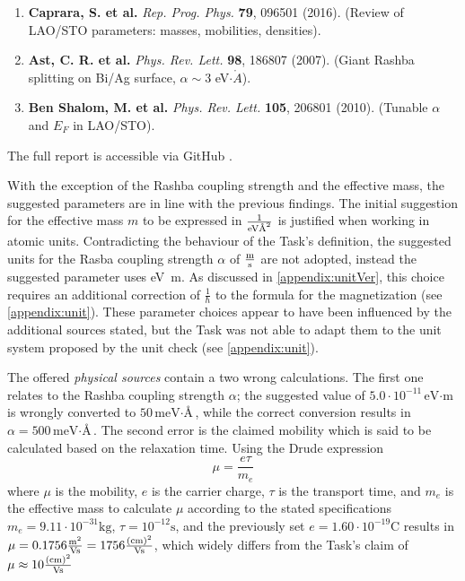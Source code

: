 \documentclass[
	fontsize = 11pt,
	paper = a4,
	draft = false,
	twoside = true,
	titlepage = false
]{scrartcl}
\numberwithin{equation}{subsection}
\begin{document}
\begin{tcolorbox} [enhanced, breakable, title=Parameter Suggestions for the Implementation as Stated in the Output, colback=blue!5!white, colframe=blue!75!black]
\begin{enumerate}
			\item \textbf{Caprara, S. et al.} \textit{Rep. Prog. Phys.} \textbf{79}, 096501 (2016). (Review of LAO/STO parameters: masses, mobilities, densities).\\
			\item \textbf{Ast, C. R. et al.} \textit{Phys. Rev. Lett.} \textbf{98}, 186807 (2007). (Giant Rashba splitting on Bi/Ag surface, $\alpha \sim 3$ eV$\cdot\mathring{A}$).\\
			\item \textbf{Ben Shalom, M. et al.} \textit{Phys. Rev. Lett.} \textbf{105}, 206801 (2010). (Tunable $\alpha$ and $E_F$ in LAO/STO).
		\end{enumerate}
	\end{tcolorbox}
	The full report is accessible via GitHub \autocite{gitParams}.
	
	With the exception of the Rashba coupling strength and the effective mass, the suggested parameters are in line with the previous findings. The initial suggestion for the effective mass $m$ to be expressed in $\si{\frac{1}{\electronvolt \angstrom^2}}$ is justified when working in atomic units. Contradicting the behaviour of the Task's definition, the suggested units for the Rasba coupling strength $\alpha$ of $\si{\frac{\meter}{\second}}$ are not adopted, instead the suggested parameter uses \si{\electronvolt \meter}. As discussed in \autoref{appendix:unitVer}, this choice requires an additional correction of $\frac{1}{\hbar}$ to the formula for the magnetization (see \autoref{appendix:unit}). These parameter choices appear to have been influenced by the additional sources stated, but the Task was not able to adapt them to the unit system proposed by the unit check (see \autoref{appendix:unit}).
	
	The offered \textit{physical sources} contain a two wrong calculations. The first one relates to the Rashba coupling strength $\alpha$; the suggested value of $5.0 \cdot 10^{-11} \si{\electronvolt \cdot \meter}$ is wrongly converted to $50 \si{\milli \electronvolt \cdot \angstrom}$, while the correct conversion results in $\alpha = 500 \si{\milli \electronvolt \cdot \angstrom}$. The second error is the claimed mobility which is said to be calculated based on the relaxation time.
	Using the Drude expression \autocite{exPhyC}
	\begin{equation}
		\mu = \frac{e \tau}{m_e}
	\end{equation}
	where $\mu$ is the mobility, $e$ is the carrier charge, $\tau$ is the transport time, and $m_e$ is the effective mass to calculate $\mu$ according to the stated specifications $m_e = 9.11 \cdot 10^{-31} \si{\kilogram}$, $\tau = 10^{-12} \si{\second}$, and the previously set $e = 1.60 \cdot 10^{-19} \si{\coulomb}$ results in $\mu = 0.1756 \si{\frac{\meter^2}{\volt \second}} = 1756 \si{\frac{(\centi \meter)^2}{\volt \second}}$, which widely differs from the Task's claim of $\mu \approx 10 \si{\frac{(\centi \meter)^2}{\volt \second}} $
	
\end{document}
